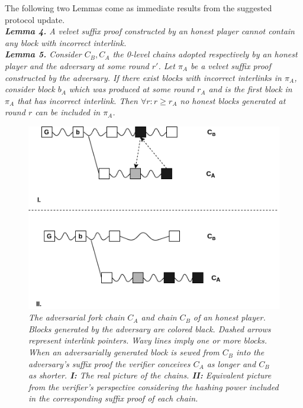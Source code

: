The following two Lemmas come as immediate results from the suggested protocol update.\\

\textit{\textbf{Lemma 4.} A velvet suffix proof constructed by an honest player cannot contain any block with incorrect interlink.}\\

\textit{\textbf{Lemma 5.} Consider $C_B, C_A$ the 0-level chains adopted respectively by an honest player and the adversary at some round $r'$. Let $\pi_A$ be a velvet suffix proof constructed by the adversary. If there exist blocks with incorrect interlinks in $\pi_A$, consider block $b_A$ which was produced at some round $r_A$ and is the first block in $\pi_A$ that has incorrect interlink. Then $\forall r: r \geq r_A$ no honest blocks generated at round $r$ can be included in $\pi_A$.} \\

\begin{figure}[h!]
	\begin{center}
		\includegraphics[scale=0.6]{figures/injection.png}
	\end{center}
	\caption{\textit{The adversarial fork chain $C_A$ and chain $C_B$ of an honest player. Blocks generated by the adversary are colored black. Dashed arrows represent interlink pointers. Wavy lines imply one or more blocks. When an adversarially generated block is sewed from $C_B$ into the adversary's suffix proof the verifier conceives $C_A$ as longer and $C_B$ as shorter.  \textbf{I:} The real picture
	 of the chains. \textbf{II:} Equivalent picture from the verifier's perspective considering the hashing power included in the corresponding suffix proof of each chain.}}
	\label{fig:injection}
\end{figure}

